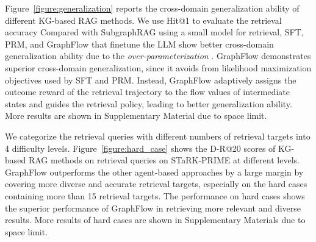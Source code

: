  Figure~\ref{figure:generalization} reports the cross-domain generalization ability of different KG-based RAG methods.
We use Hit@1 to evaluate the retrieval accuracy
Compared with SubgraphRAG using a small model for retrieval,
SFT, PRM, and GraphFlow that finetune the LLM show better cross-domain generalization ability due to the \textit{over-parameterization} \cite{leike2018scalable,gao2023scaling}. 
GraphFlow demonstrates superior cross-domain generalization, since it avoids from likelihood maximization objectives used by SFT and PRM.
Instead, GraphFlow adaptively assigns the outcome reward of the retrieval trajectory to the flow values of intermediate states and guides the retrieval policy, leading to better generalization ability.
More results are shown in Supplementary Material due to space limit.

We categorize the retrieval queries with different numbers of retrieval targets into 4 difficulty levels.
Figure~\ref{figure:hard_case} shows the D-R@20 scores of KG-based RAG methods on retrieval queries on STaRK-PRIME at different levels.
GraphFlow outperforms the other agent-based approaches by a large margin by covering more diverse and accurate retrieval targets, especially on the hard cases containing more than 15 retrieval targets.
The performance on hard cases shows the superior performance of GraphFlow in retrieving more relevant and diverse results.
More results of hard cases are shown in Supplementary Materials due to space limit.









